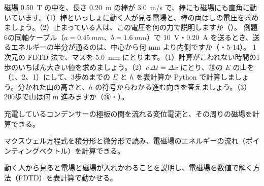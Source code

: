 \bkproblem 磁場 \qty{0.50}{T} の中を、長さ \qty{0.20}{m} の棒が \qty{3.0}{m/s} で、棒にも磁場にも直角に動いています。（1）棒といっしょに動く人が見る電場と、棒の両はしの電圧を求めましょう。（2）止まっている人は、この電圧を何の力で説明しますか（\nobreak{}\nobreak）。
\bkproblem 例題6の同軸ケーブル（$a=\qty{0.45}{mm}$、$b=\qty{1.6}{mm}$）で \qty{10}{V}・\qty{0.20}{A} を送るとき、送るエネルギーの半分が通るのは、中心から何 mm より内側ですか（\nobreak{}\nobreak・5-14）。
\bkproblem 1次元の FDTD 法で、マスを \qty{5.0}{mm} にとります。（1）計算がこわれない時間の1歩のいちばん大きい値を求めましょう。（2）$c\,\Delta t=\Delta x$ にとり、⑩の $E$ の山を（1、2、1）にして、3歩めまでの $E$ と $h$ を表計算か Python で計算しましょう。分かれた山の高さと、$h$ の符号からわかる進む向きを答えましょう。（3）200歩で山は何 m 進みますか（⑩・\nobreak{}\nobreak）。

\begin{furikaeri}
\begin{checklist}
\item 充電しているコンデンサーの極板の間を流れる変位電流と、その周りの磁場を計算できる。
\item マクスウェル方程式を積分形と微分形で読み、電磁場のエネルギーの流れ（ポインティングベクトル）を計算できる。
\item 動く人から見ると電場と磁場が入れかわることを説明し、電磁場を数値で解く方法（FDTD）を表計算で動かせる。
\end{checklist}
\end{furikaeri}
